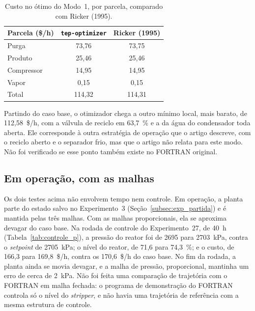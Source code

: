 \begin{table}[htbp]
	\centering
	\caption{Custo no ótimo do Modo~1, por parcela, comparado com Ricker (1995).}
	\label{tab:otimo}
	\footnotesize
	\begin{tabular}{|l|c|c|}
		\hline
		\textbf{Parcela (\$/h)} & \textbf{\texttt{tep-optimizer}} & \textbf{Ricker (1995)} \\
		\hline
		Purga & 73,76 & 73,75 \\
		Produto & 25,46 & 25,46 \\
		Compressor & 14,95 & 14,95 \\
		Vapor & 0,15 & 0,15 \\
		\hline
		Total & 114,32 & 114,31 \\
		\hline
	\end{tabular}
\end{table}

Partindo do caso base, o otimizador chega a outro mínimo local, mais barato, de 112,58~\$/h, com a válvula de reciclo em 63,7~\% e a da água do condensador toda aberta. Ele corresponde à outra estratégia de operação que o artigo descreve, com o reciclo aberto e o separador frio, mas que o artigo não relata para este modo. Não foi verificado se esse ponto também existe no FORTRAN original.

\subsection{Em operação, com as malhas}
\label{subsec:val_operacao}

Os dois testes acima não envolvem tempo nem controle. Em operação, a planta parte do estado salvo no Experimento~3 (Seção~\ref{subsec:exp_partida}) e é mantida pelas três malhas. Com as malhas proporcionais, ela se aproxima devagar do caso base. Na rodada de controle do Experimento~27, de 40~h (Tabela~\ref{tab:controle_p}), a pressão do reator foi de 2695 para 2703~kPa, contra o \textit{setpoint} de 2705~kPa; o nível do reator, de 71,6 para 74,3~\%; e o custo, de 166,3 para 169,8~\$/h, contra os 170,6~\$/h do caso base. No fim da rodada, a planta ainda se movia devagar, e a malha de pressão, proporcional, mantinha um erro de cerca de 2~kPa. Não foi feita uma comparação de trajetória com o FORTRAN em malha fechada: o programa de demonstração do FORTRAN controla só o nível do \textit{stripper}, e não havia uma trajetória de referência com a mesma estrutura de controle.

